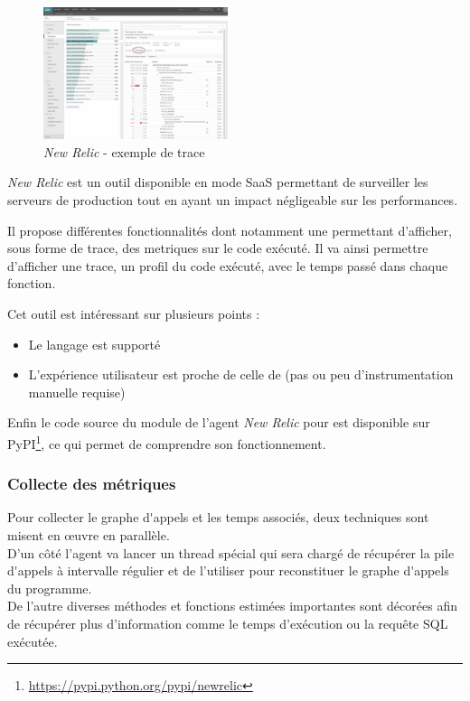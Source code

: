 \begin{figure}
  \vspace{-30pt}
  \begin{center}
    \includegraphics[width=0.48\textwidth]{images/new-relic_trace}
  \end{center}
  \vspace{-22pt}
  \caption{\emph{New Relic} - exemple de trace}
  \vspace{-20pt}
\end{figure}

\emph{New Relic} est un outil disponible en mode \gls{SaaS} permettant de surveiller les serveurs de \gls{production} tout en ayant un impact négligeable sur les performances.

Il propose différentes fonctionnalités dont notamment une permettant d'afficher, sous forme de trace, des \glspl{metrique} sur le code exécuté. Il va ainsi permettre d'afficher une trace, un profil du code exécuté, avec le temps passé dans chaque fonction.
 
\clearpage
Cet outil est intéressant sur plusieurs points :
\begin{itemize}
  \item Le langage \Python est supporté
  \item L'expérience utilisateur est proche de celle de \Blackfire (pas ou peu d'instrumentation manuelle requise)
\end{itemize}
  
Enfin le code source du module de l'agent \emph{New Relic} pour \Python est disponible sur \gls{PyPI}\footnote{\url{https://pypi.python.org/pypi/newrelic}}, ce qui permet de comprendre son fonctionnement.
  
  \subsubsection{Collecte des métriques}
Pour collecter le \gls{graphe d'appels} et les temps associés, deux techniques sont misent en œuvre en parallèle. \\
D'un côté l'agent va lancer un thread spécial qui sera chargé de récupérer la \gls{pile d'appels} à intervalle régulier et de l'utiliser pour reconstituer le \gls{graphe d'appels} du programme. \\
De l'autre diverses méthodes et fonctions estimées importantes sont décorées afin de récupérer plus d'information comme le temps d'exécution ou la requête SQL exécutée.

